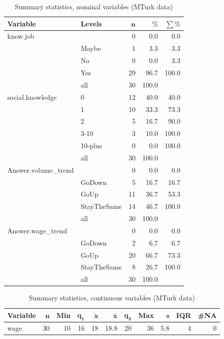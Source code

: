 \documentclass[a4paper,10pt]{article}\usepackage[]{graphicx}\usepackage[]{color}
\begin{document}
\begin{table}[ht]
\centering
{\footnotesize
\begin{tabular}{ll|rrr}
 \textbf{Variable} & \textbf{Levels} & $\mathbf{n}$ & $\mathbf{\%}$ & $\mathbf{\sum \%}$ \\ 
  \hline
know.job &  & 0 & 0.0 & 0.0 \\ 
   & Maybe & 1 & 3.3 & 3.3 \\ 
   & No & 0 & 0.0 & 3.3 \\ 
   & Yes & 29 & 96.7 & 100.0 \\ 
   \hline
 & all & 30 & 100.0 &  \\ 
   \hline
\hline
social.knowledge & 0 & 12 & 40.0 & 40.0 \\ 
   & 1 & 10 & 33.3 & 73.3 \\ 
   & 2 & 5 & 16.7 & 90.0 \\ 
   & 3-10 & 3 & 10.0 & 100.0 \\ 
   & 10-plus & 0 & 0.0 & 100.0 \\ 
   \hline
 & all & 30 & 100.0 &  \\ 
   \hline
\hline
Answer.volume\_trend &  & 0 & 0.0 & 0.0 \\ 
   & GoDown & 5 & 16.7 & 16.7 \\ 
   & GoUp & 11 & 36.7 & 53.3 \\ 
   & StayTheSame & 14 & 46.7 & 100.0 \\ 
   \hline
 & all & 30 & 100.0 &  \\ 
   \hline
\hline
Answer.wage\_trend &  & 0 & 0.0 & 0.0 \\ 
   & GoDown & 2 & 6.7 & 6.7 \\ 
   & GoUp & 20 & 66.7 & 73.3 \\ 
   & StayTheSame & 8 & 26.7 & 100.0 \\ 
   \hline
 & all & 30 & 100.0 &  \\ 
   \hline
\hline
\end{tabular}
}
\caption{Summary statistics, nominal variables (MTurk data)} 
\label{tab1:13-1070}
\end{table}
\begin{table}[ht]
\centering
{\footnotesize
\begin{tabular}{lrrrrrrrrrr}
 \textbf{Variable} & $\mathbf{n}$ & \textbf{Min} & $\mathbf{q_1}$ & $\mathbf{\widetilde{x}}$ & $\mathbf{\bar{x}}$ & $\mathbf{q_3}$ & \textbf{Max} & $\mathbf{s}$ & \textbf{IQR} & \textbf{\#NA} \\ 
  \hline
wage & 30 & 10 & 16 & 18 & 18.8 & 20 & 36 & 5.8 & 4 & 0 \\ 
  \end{tabular}
}
\caption{Summary statistics, continuous variables (MTurk data)} 
\label{tab2:13-1070}
\end{table}
\end{document}
